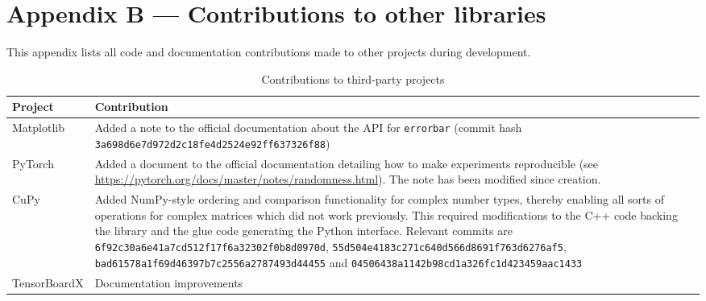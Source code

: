 \chapter{Appendix B --- Contributions to other libraries}\label{ch:appendixB}

This appendix lists all code and documentation contributions made to other projects during
development.

\begin{table}
    \centering
    \caption{Contributions to third-party projects}
    \label{tbl:pull}
    \begin{tabularx}{\textwidth}{lX}
        \toprule
        Project              & Contribution                                                  \tabularnewline
        \midrule
        Matplotlib           & Added a note to the official documentation about the API
                               for \texttt{errorbar} (commit hash
                               \texttt{3a698d6e7d972d2c18fe4d2524e92ff637326f88})            \tabularnewline
        PyTorch              & Added a document to the official documentation detailing
                               how to make experiments reproducible (see
                               \url{https://pytorch.org/docs/master/notes/randomness.html}).
                               The note has been modified since creation.                    \tabularnewline
        CuPy                 & Added NumPy-style ordering and comparison
                               functionality
                               for complex number types, thereby enabling all sorts of operations for
                               complex matrices which did not work previously. This required
                               modifications to the C++ code backing the library and the glue code
                               generating the Python interface. Relevant commits are
                               \texttt{6f92c30a6e41a7cd512f17f6a32302f0b8d0970d},
                               \texttt{55d504e4183c271c640d566d8691f763d6276af5},
                               \texttt{bad61578a1f69d46397b7c2556a2787493d44455} and
                               \texttt{04506438a1142b98cd1a326fc1d423459aac1433}             \tabularnewline
        TensorBoardX         & Documentation improvements                                    \tabularnewline
        \bottomrule
    \end{tabularx}
\end{table}
